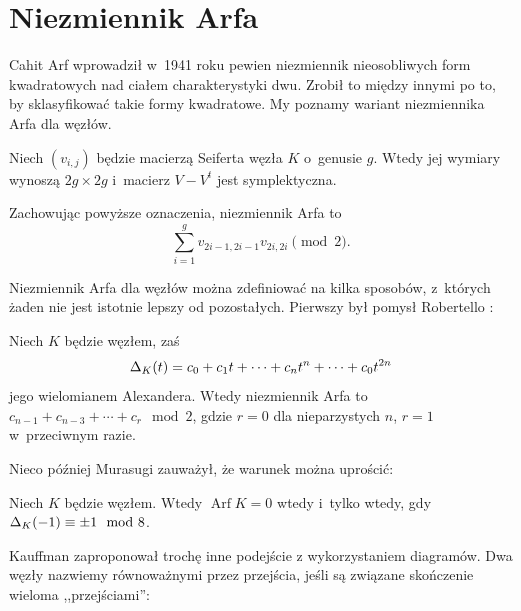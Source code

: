 
\section{Niezmiennik Arfa}
%

Cahit Arf wprowadził w~1941 roku pewien niezmiennik nieosobliwych form kwadratowych nad ciałem charakterystyki dwu.
%
Zrobił to między innymi po to, by sklasyfikować takie formy kwadratowe.
My poznamy wariant niezmiennika Arfa dla węzłów.

Niech $(v_{i,j})$ będzie macierzą Seiferta węzła $K$ o~genusie $g$.
Wtedy jej wymiary wynoszą $2g \times 2g$ i~macierz $V-V^t$ jest symplektyczna.

\begin{definition}
    Zachowując powyższe oznaczenia, niezmiennik Arfa to
    \begin{equation}
        \sum^g_{i=1}v_{2i-1,2i-1}v_{2i,2i} \pmod 2.
    \end{equation}
\end{definition}

Niezmiennik Arfa dla węzłów można zdefiniować na kilka sposobów, z~których żaden nie jest istotnie lepszy od pozostałych.
Pierwszy był pomysł Robertello \cite{robertello1965}:
%

\begin{proposition}[Robertello, 1965]
    Niech $K$ będzie węzłem, zaś
    \begin{equation}
        \Delta_K(t)=c_{0}+c_{1}t+\cdots +c_{n}t^{n}+\cdots +c_{0}t^{2n}
    \end{equation}
    jego wielomianem Alexandera.
    Wtedy niezmiennik Arfa to $c_{n-1}+c_{n-3}+\cdots +c_{r} \mod 2$, gdzie $r = 0$ dla nieparzystych $n$, $r = 1$ w~przeciwnym razie.
\end{proposition}

Nieco później Murasugi \cite{murasugi1969} zauważył, że warunek można uprościć:
%

\begin{proposition}[Murasugi, 1969]
    \label{prp:arf_murasugi}
    Niech $K$ będzie węzłem.
%
    Wtedy $\operatorname{Arf} K = 0$ wtedy i~tylko wtedy, gdy $\Delta_K(-1) \equiv \pm 1 \mod 8$.
\end{proposition}

Kauffman \cite[s. 143]{kauffman1983} zaproponował trochę inne podejście z wykorzystaniem diagramów.
%
Dwa węzły nazwiemy równoważnymi przez przejścia, jeśli są związane skończenie wieloma ,,przejściami'':

